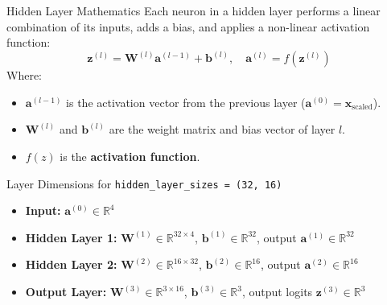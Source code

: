 \documentclass[9pt]{beamer}
\begin{document}
\begin{frame}{Hidden Layer Mathematics}
  Each neuron in a hidden layer performs a linear combination of its inputs, adds a bias, and applies a non-linear activation function:
  $$\mathbf{z}^{(l)} = \mathbf{W}^{(l)} \mathbf{a}^{(l-1)} + \mathbf{b}^{(l)}, \quad \mathbf{a}^{(l)} = f(\mathbf{z}^{(l)})$$
  Where:
  \begin{itemize}
    \item $\mathbf{a}^{(l-1)}$ is the activation vector from the previous layer ($\mathbf{a}^{(0)} = \mathbf{x}_{\text{scaled}}$).
    \item $\mathbf{W}^{(l)}$ and $\mathbf{b}^{(l)}$ are the weight matrix and bias vector of layer $l$.
    \item $f(z)$ is the \textbf{activation function}.
  \end{itemize}
  \begin{block}{Layer Dimensions for \texttt{hidden\_layer\_sizes = (32, 16)}}
    \begin{itemize}
      \item \textbf{Input:} $\mathbf{a}^{(0)} \in \mathbb{R}^4$
      \item \textbf{Hidden Layer 1:} $\mathbf{W}^{(1)} \in \mathbb{R}^{32 \times 4}$, $\mathbf{b}^{(1)} \in \mathbb{R}^{32}$, output $\mathbf{a}^{(1)} \in \mathbb{R}^{32}$
      \item \textbf{Hidden Layer 2:} $\mathbf{W}^{(2)} \in \mathbb{R}^{16 \times 32}$, $\mathbf{b}^{(2)} \in \mathbb{R}^{16}$, output $\mathbf{a}^{(2)} \in \mathbb{R}^{16}$
      \item \textbf{Output Layer:} $\mathbf{W}^{(3)} \in \mathbb{R}^{3 \times 16}$, $\mathbf{b}^{(3)} \in \mathbb{R}^3$, output logits $\mathbf{z}^{(3)} \in \mathbb{R}^3$
    \end{itemize}
  \end{block}
\end{frame}
\end{document}
